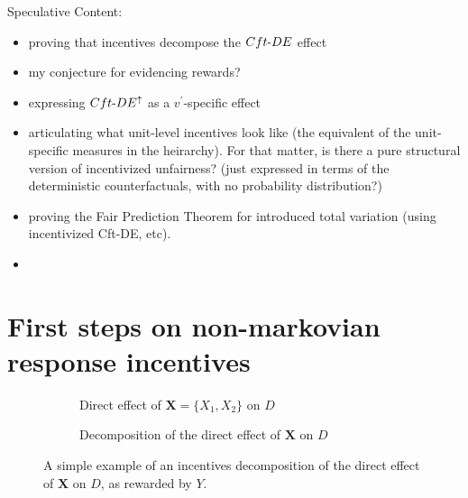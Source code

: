 \documentclass[letterpaper,10pt]{article}
\begin{document}
Speculative Content:
\begin{itemize}
  \item proving that incentives decompose the $Cft{\text -}DE$ effect
  \item my conjecture for evidencing rewards?
  \item expressing $Cft{\text -}DE^\uparrow$ as a $v^\prime$-specific effect
  \item articulating what unit-level incentives look like (the equivalent of the unit-specific measures in the heirarchy). For that matter, is there a pure structural version of incentivized unfairness? (just expressed in terms of the deterministic counterfactuals, with no probability distribution?)
  \item proving the Fair Prediction Theorem for introduced total variation (using incentivized Cft-DE, etc).
  \item 
\end{itemize}

\newpage
\section{First steps on non-markovian response incentives}

\begin{figure}
\centering
\begin{subfigure}{.5\textwidth}
  \centering
  \caption{Direct effect of $\mathbf{X}=\{X_1,X_2\}$ on $D$}
  \label{fig:direct}
\end{subfigure}%
\begin{subfigure}{.5\textwidth}
  \centering
  \caption{Decomposition of the direct effect of $\mathbf{X}$ on $D$}
  \label{fig:decomp}
\end{subfigure}
\caption{A simple example of an incentives decomposition of the direct effect of $\mathbf{X}$ on $D$, as rewarded by $Y$.}
\label{fig:simple}
\end{figure}
\end{document}
